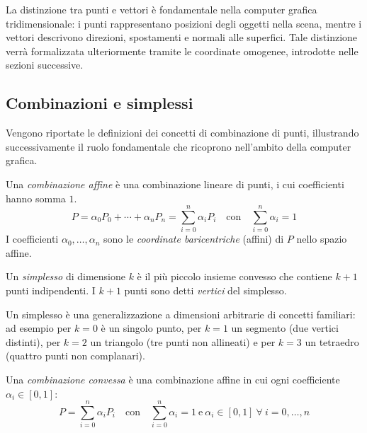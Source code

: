 La distinzione tra punti e vettori è fondamentale nella computer grafica tridimensionale: i punti rappresentano posizioni degli oggetti nella scena, mentre i vettori descrivono direzioni, spostamenti e normali alle superfici. Tale distinzione verrà formalizzata ulteriormente tramite le coordinate omogenee, introdotte nelle sezioni successive.


\subsection{Combinazioni e simplessi}
\label{subsec:combinazioni_simplessi}
Vengono riportate le definizioni dei concetti di combinazione di punti, illustrando successivamente il ruolo fondamentale che ricoprono nell'ambito della computer grafica.

\begin{definizione}
    Una \emph{combinazione affine} è una combinazione lineare di punti, i cui coefficienti hanno somma $1$.
    \[
        P = \alpha_0 P_0 + \cdots + \alpha_n P_n = \sum_{i=0}^{n} \alpha_i P_i \quad \text{con} \quad \sum_{i=0}^{n} \alpha_i = 1
    \]
    I coefficienti $\alpha_0, \dots, \alpha_n$ sono le \emph{coordinate baricentriche} (affini) di $P$ nello spazio affine.
\end{definizione}

\begin{definizione}[Simplesso]
    Un \emph{simplesso} di dimensione $k$ è il più piccolo insieme convesso che contiene $k+1$ punti indipendenti.
    I $k+1$ punti sono detti \emph{vertici} del simplesso.
\end{definizione}

\begin{esempio}
    Un simplesso è una generalizzazione a dimensioni arbitrarie di concetti familiari: ad esempio per $k = 0$ è un singolo punto, per $k = 1$ un segmento (due vertici distinti), per $k = 2$ un triangolo (tre punti non allineati) e per $k = 3$ un tetraedro (quattro punti non complanari).
\end{esempio}

\begin{definizione}
    Una \emph{combinazione convessa} è una combinazione affine in cui ogni coefficiente $\alpha_i \in [0, 1]$:
    \[
        P = \sum_{i=0}^{n} \alpha_i P_i \quad \text{con} \quad \sum_{i=0}^{n} \alpha_i = 1\ \text{e}\ \alpha_i \in [0, 1]\ \forall\ i = 0, \ldots , n
    \]
\end{definizione}

